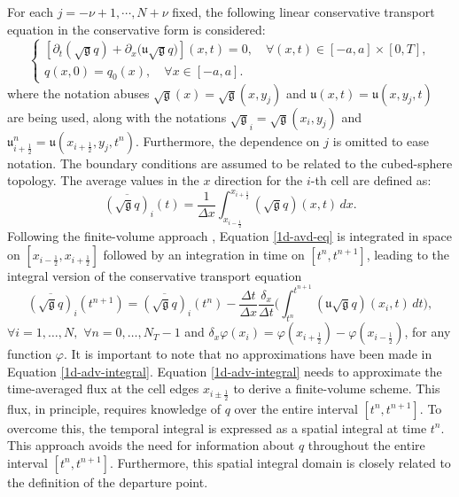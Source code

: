\documentclass[preprint,12pt]{elsarticle}
\begin{document}
\begin{linenumbers}
For each $j=-\nu+1, \cdots, N+\nu$ fixed, the following linear conservative transport equation in the conservative form is considered:
\begin{equation}
	\label{1d-avd-eq}
	\begin{cases}
		[{\partial_t (\sqrt{\mathfrak{g}} {q})} + {\partial_x (\mathfrak{u}\sqrt{\mathfrak{g}}{q}})](x, t)
		= 0, \quad \forall (x,t) \in [-a, a]\times [0,T],\\
		q(x,0) = q_0(x), \quad \forall x \in [-a, a].
	\end{cases}
\end{equation}
where the notation abuses $\sqrt{\mathfrak{g}}(x) = \sqrt{\mathfrak{g}}(x,y_j)$ and $\mathfrak{u}(x,t) = \mathfrak{u}(x,y_j,t)$ are being used, along with the notations $\sqrt{\mathfrak{g}}_i = \sqrt{\mathfrak{g}}(x_i,y_j)$ and ${\mathfrak{u}}_{i+\frac{1}{2}}^n = {\mathfrak{u}}(x_{i+\frac{1}{2}},y_j,t^n)$.
Furthermore, the dependence on $j$ is omitted to ease notation.
The boundary conditions are assumed to be related to the cubed-sphere topology.
The average values in the $x$ direction for the $i$-th cell are defined as:
\begin{equation}
	\label{1d-average-def}
	\overline{(\sqrt{\mathfrak{g}}q)}_{i}(t) = \frac{1}{\Delta x} \int_{x_{i-\frac{1}{2}}}^{x_{i+\frac{1}{2}}} {(\sqrt{\mathfrak{g}}q)}(x,t) \,dx.
\end{equation}
Following the finite-volume approach \cite{leveque:1990},
Equation \eqref{1d-avd-eq} is integrated in space on 
$[x_{i-\frac{1}{2}},x_{i+\frac{1}{2}}]$
followed by an integration in time on $[t^{n},t^{n+1}]$, leading to the integral version of the conservative transport equation
\begin{equation}
	\label{1d-adv-integral}
	\overline{(\sqrt{\mathfrak{g}}q)}_i(t^{n+1}) =  \overline{(\sqrt{\mathfrak{g}}q)}_i(t^{n}) -
	\frac{\Delta t}{\Delta x}
	\frac{\delta_x}{\Delta t}\bigg(
	\int_{t^{n}}^{t^{n+1}}
	{(\mathfrak{u}{\sqrt{\mathfrak{g}}q})}(x_i, t) \,dt \bigg),
\end{equation}
$ \forall i = 1, \ldots, N,$ $\forall n = 0, \ldots, N_T-1$
and $\delta_x \varphi(x_i) = \varphi(x_{i+\frac{1}{2}})-\varphi(x_{i-\frac{1}{2}})$, for any function $\varphi$.
It is important to note that no approximations have been made in Equation \eqref{1d-adv-integral}. 
Equation \eqref{1d-adv-integral} needs to approximate the time-averaged flux at the cell edges $x_{i\pm\frac{1}{2}}$
to derive a finite-volume scheme. This flux, in principle, requires knowledge of $q$ over the entire interval $[t^n, t^{n+1}]$. 
To overcome this, the temporal integral is expressed as a spatial integral at time $t^n$. 
This approach avoids the need for information about $q$ throughout the entire interval $[t^n, t^{n+1}]$. 
Furthermore, this spatial integral domain is closely related to the definition of the 
departure point. 


\end{linenumbers}
\end{document}
